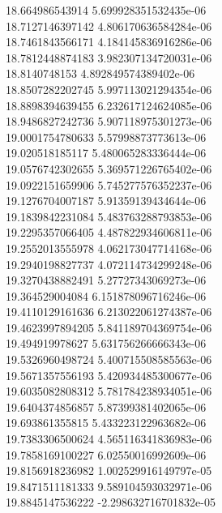 {18.664986543914 5.699928351532435e-06 \\
18.7127146397142 4.806170636584284e-06 \\
18.7461843566171 4.184145836916286e-06 \\
18.7812448874183 3.982307134720031e-06 \\
18.8140748153 4.892849574389402e-06 \\
18.8507282202745 5.997113021294354e-06 \\
18.8898394639455 6.232617124624085e-06 \\
18.9486827242736 5.907118975301273e-06 \\
19.0001754780633 5.57998873773613e-06 \\
19.020518185117 5.480065283336444e-06 \\
19.0576742302655 5.369571226765402e-06 \\
19.0922151659906 5.745277576352237e-06 \\
19.1276704007187 5.91359139434644e-06 \\
19.1839842231084 5.483763288793853e-06 \\
19.2295357066405 4.487822934606811e-06 \\
19.2552013555978 4.062173047714168e-06 \\
19.2940198827737 4.072114734299248e-06 \\
19.3270438882491 5.27727343069273e-06 \\
19.364529004084 6.151878096716246e-06 \\
19.4110129161636 6.213022061274387e-06 \\
19.4623997894205 5.841189704369754e-06 \\
19.494919978627 5.631756266666343e-06 \\
19.5326960498724 5.400715508585563e-06 \\
19.5671357556193 5.420934485300677e-06 \\
19.6035082808312 5.781784238934051e-06 \\
19.6404374856857 5.87399381402065e-06 \\
19.693861355815 5.433223122963682e-06 \\
19.7383306500624 4.565116341836983e-06 \\
19.7858169100227 6.02550016992609e-06 \\
19.8156918236982 1.002529916149797e-05 \\
19.8471511181333 9.589104593032971e-06 \\
19.8845147536222 -2.298632716701832e-05 \\
}
